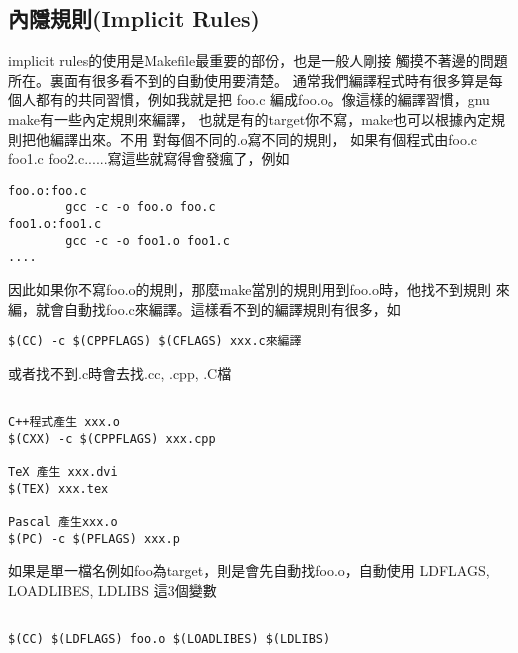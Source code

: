   \subsection{內隱規則(Implicit Rules)}
  implicit rules的使用是Makefile最重要的部份，也是一般人剛接
  觸摸不著邊的問題所在。裏面有很多看不到的自動使用要清楚。
  通常我們編譯程式時有很多算是每個人都有的共同習慣，例如我就是把
  foo.c 編成foo.o。像這樣的編譯習慣，gnu make有一些內定規則來編譯，
  也就是有的target你不寫，make也可以根據內定規則把他編譯出來。不用
  對每個不同的.o寫不同的規則，
  如果有個程式由foo.c foo1.c foo2.c......寫這些就寫得會發瘋了，例如
  \begin{verbatim}
foo.o:foo.c
        gcc -c -o foo.o foo.c
foo1.o:foo1.c
        gcc -c -o foo1.o foo1.c
....
  \end{verbatim}
  因此如果你不寫foo.o的規則，那麼make當別的規則用到foo.o時，他找不到規則
  來編，就會自動找foo.c來編譯。這樣看不到的編譯規則有很多，如
  \begin{verbatim}
$(CC) -c $(CPPFLAGS) $(CFLAGS) xxx.c來編譯
  \end{verbatim}
  或者找不到.c時會去找.cc, .cpp, .C檔
  \begin{verbatim}

C++程式產生 xxx.o
$(CXX) -c $(CPPFLAGS) xxx.cpp

TeX 產生 xxx.dvi
$(TEX) xxx.tex

Pascal 產生xxx.o
$(PC) -c $(PFLAGS) xxx.p

  \end{verbatim}
  如果是單一檔名例如foo為target，則是會先自動找foo.o，自動使用
  LDFLAGS, LOADLIBES, LDLIBS 這3個變數
  \begin{verbatim}

$(CC) $(LDFLAGS) foo.o $(LOADLIBES) $(LDLIBS)

  \end{verbatim}
